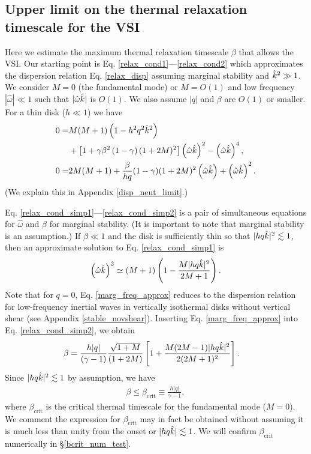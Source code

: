 \subsection{Upper limit on the thermal relaxation timescale for the
  VSI}\label{iso_vsi_beta_crit}
Here we estimate the maximum thermal relaxation timescale 
$\beta$ that allows the VSI.  
Our starting point is Eq. \ref{relax_cond1}---\ref{relax_cond2} which
approximates the dispersion relation Eq. \ref{relax_disp} assuming marginal
stability and $\hat{k}^2\gg 1$. We consider $M=0$ (the 
fundamental mode) or  $M=O(1)$ and low frequency $|\hat{\omega}|\ll
1$ such that $|\hat{\omega}\hat{k}|$ is $O(1)$. We 
also assume $|q|$ and $\beta$ are $O(1)$ or smaller. For a thin disk
($h \ll 1$) we have 
\begin{align}
 0 = &M(M+1)\left(1-h^2q^2\hat{k}^2\right) \notag\\ 
 &+ \left[1 +
    \gamma\beta^2\left(1-\gamma\right)(1+2M)^2\right]\left(\hat{\omega}\hat{k}\right)^2
   -  \left(\hat{\omega}\hat{k}\right)^4,\label{relax_cond_simp1}\\
   0= &2M(M+1) + \frac{\beta}{h q} (1-\gamma)(1+2M)^2
   \left(\hat{\omega}\hat{k}\right) + \left(\hat{\omega}\hat{k}\right)^2. \label{relax_cond_simp2}
\end{align}
(We explain this in Appendix \ref{disp_neut_limit}.)

Eq. \ref{relax_cond_simp1}---\ref{relax_cond_simp2} is a pair of
simultaneous equations for $\hat{\omega}$ and $\beta$ for marginal
stability. (It is important to note that marginal stability is an
assumption.) If $\beta\ll 1$ and the disk is sufficiently thin so that  
$|h q \hat{k} |^2\lesssim 1$, 
then an approximate solution to Eq. \ref{relax_cond_simp1} is 
\begin{align}
  \left(\hat{\omega}\hat{k}\right)^2 \simeq (M+1)\left(1 -
    \frac{M|h q \hat{k}|^2}{2M+1}\right).  \label{marg_freq_approx}
\end{align}
Note that for $q=0$, Eq. \ref{marg_freq_approx} reduces to 
the dispersion relation for low-frequency inertial waves in vertically
isothermal disks without vertical shear (see Appendix
\ref{stable_novshear}). Inserting Eq. \ref{marg_freq_approx} into
Eq. \ref{relax_cond_simp2}, we obtain 
\begin{align}\label{bcrit_gen}
  \beta &= \frac{h|q|}{(\gamma - 1)}
  \frac{\sqrt{1+M}}{(1+2M)}\left[1 + \frac{M(2M-1)|h q
      \hat{k}|^2}{2(2M+1)^2}\right].
\end{align}
Since $|h q \hat{k}|^2\lesssim 1$ by assumption, we have  
\begin{align}\label{iso_vsi_cond}
  \beta\leq \beta_\mathrm{crit}  \equiv
  \frac{h|q|}{\gamma-1}, 
\end{align}
where $\beta_\mathrm{crit}$ is the critical thermal timescale for
the fundamental mode ($M=0$). 
We comment the expression for $\beta_\mathrm{crit}$ may in fact be
obtained without assuming it is much less than unity from the onset or
$|h q\hat{k}|\lesssim 1$. %
We will  
confirm $\beta_\mathrm{crit}$ numerically in \S\ref{bcrit_num_test}. 

